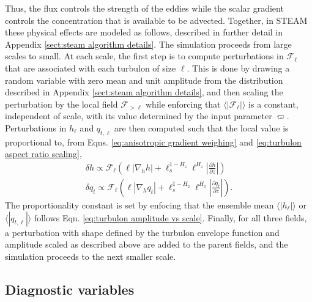 \documentclass[acp, manuscript, english]{copernicus}
\begin{document}
Thus, the flux controls the strength of the eddies while the scalar gradient controls the concentration that is available to be advected. Together, in STEAM these physical effects are modeled as follows, described in further detail in Appendix \ref{sect:steam algorithm details}. The simulation proceeds from large scales to small. At each scale, the first step is to compute perturbations in $\mathcal{F}_\ell$ that are associated with each turbulon of size $\ell$. This is done by drawing a random variable with zero mean and unit amplitude from the distribution described in Appendix \ref{sect:steam algorithm details}, and then scaling the perturbation by the local field $\mathcal{F}_{>\ell}$ while enforcing that $\langle | \mathcal{F}_\ell | \rangle$ is a constant, independent of scale, with its value determined by the input parameter $\varpi$. Perturbations in $h_\ell$ and $q_{t,\ell}$ are then computed such that the local value is proportional to, from Eqns. \ref{eq:anisotropic gradient weighing} and \ref{eq:turbulon aspect ratio scaling},
\begin{align}
  \delta h \propto \mathcal{F}_\ell\left(\ell|\nabla_h h| + \ell_s^{1-H_z}\ell^{H_z}|\frac{\partial h}{\partial z}|\right) \\
  \delta q_t \propto \mathcal{F}_\ell\left(\ell|\nabla_h q_t| + \ell_s^{1-H_z}\ell^{H_z}|\frac{\partial q_t}{\partial z}|\right).
\end{align}
The proportionality constant is set by enfocing that the ensemble mean $\langle |h_\ell|\rangle$ or $\langle |q_{t,\ell}|\rangle$ follows Eqn. \ref{eq:turbulon amplitude vs scale}. Finally, for all three fields, a perturbation with shape defined by the turbulon envelope function and amplitude scaled as described above are added to the parent fields, and the simulation proceeds to the next smaller scale.

\subsection{Diagnostic variables} \label{sect:diagnostic variables}
\end{document}
